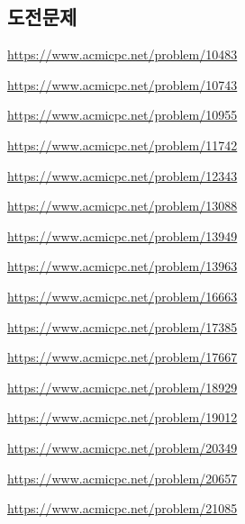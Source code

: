 \subsection{도전문제}
\begin{problem} \url{https://www.acmicpc.net/problem/10483} \end{problem}
\begin{problem} \url{https://www.acmicpc.net/problem/10743} \end{problem}
\begin{problem} \url{https://www.acmicpc.net/problem/10955} \end{problem}
\begin{problem} \url{https://www.acmicpc.net/problem/11742} \end{problem}
\begin{problem} \url{https://www.acmicpc.net/problem/12343} \end{problem}
\begin{problem} \url{https://www.acmicpc.net/problem/13088} \end{problem}
\begin{problem} \url{https://www.acmicpc.net/problem/13949} \end{problem}
\begin{problem} \url{https://www.acmicpc.net/problem/13963} \end{problem}
\begin{problem} \url{https://www.acmicpc.net/problem/16663} \end{problem}
\begin{problem} \url{https://www.acmicpc.net/problem/17385} \end{problem}
\begin{problem} \url{https://www.acmicpc.net/problem/17667} \end{problem}
\begin{problem} \url{https://www.acmicpc.net/problem/18929} \end{problem}
\begin{problem} \url{https://www.acmicpc.net/problem/19012} \end{problem}
\begin{problem} \url{https://www.acmicpc.net/problem/20349} \end{problem}
\begin{problem} \url{https://www.acmicpc.net/problem/20657} \end{problem}
\begin{problem} \url{https://www.acmicpc.net/problem/21085} \end{problem}
